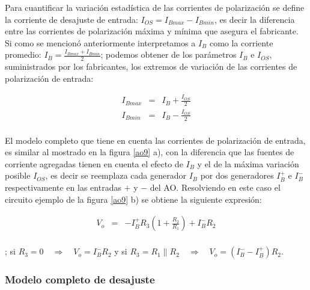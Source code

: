 Para cuantificar la variación estadística de las corrientes de
polarización se define la corriente de desajuste de entrada:
$I_{OS}=I_{Bmax}-I_{Bmin}$, es decir la diferencia entre las
corrientes de polarización máxima y mínima que asegura el
fabricante. Si como se mencionó anteriormente interpretamos a $I_B$
como la corriente promedio: $I_B=\frac{\displaystyle
	I_{Bmax}+I_{Bmin}}{\displaystyle 2}$; podemos obtener de los
parámetros $I_B$ e $I_{OS}$, suministrados por los fabricantes, los
extremos de variación de las corrientes de polarización de entrada:

\begin{center}
\end{center}
\begin{eqnarray}
	\nonumber
	I_{Bmax} & = & I_B + \frac{\displaystyle I_{OS}}{\displaystyle 2} \\
	\nonumber
	I_{Bmin} & = & I_B - \frac{\displaystyle I_{OS}}{\displaystyle 2} \\\label{ec3}
\end{eqnarray}

El modelo completo que tiene en cuenta las corrientes de
polarización de entrada, es similar al mostrado en la figura
\ref{ao9} a), con la diferencia que las fuentes de corriente
agregadas tienen en cuenta el efecto de $I_B$ y el de la máxima
variación posible $I_{OS}$, es decir se reemplaza cada generador
$I_B$ por dos generadores $I_B^+$ e $I_B^-$ respectivamente en las
entradas $+$ y $-$ del AO. Resolviendo en este caso el circuito
ejemplo de la figura \ref{ao9} b) se obtiene la siguiente expresión:
\begin{center}
	\begin{eqnarray}
		\nonumber
		V_o & = & - I_B^+ R_3 (1+\frac{\displaystyle R_2}{\displaystyle R_1}) + I_B^- R_2\\
		\nonumber
	\end{eqnarray}
\end{center}
; si $R_3=0 \quad \Rightarrow \quad V_o=I_B^- R_2$ y si
$R_3=R_1\|R_2 \quad \Rightarrow \quad V_o=(I_B^- - I_B^+) R_2$.

\subsubsection{Modelo completo de desajuste}

